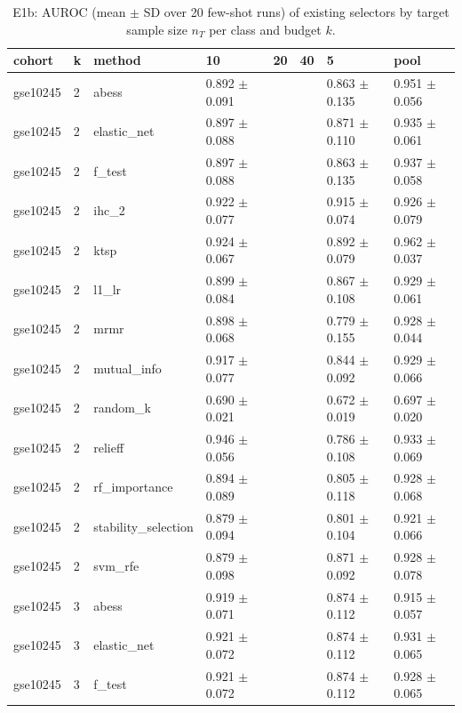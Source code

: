 \begin{table}[t]
  \centering
  \caption{E1b: AUROC (mean $\pm$ SD over 20 few-shot runs) of existing selectors by target sample size $n_T$ per class and budget $k$.}
  \label{tab:e1b}
  \small
  \begin{tabular}{llllllll}
    \toprule
    cohort & k & method & 10 & 20 & 40 & 5 & pool \\
    \midrule
    gse10245 & 2 & abess & 0.892 $\pm$ 0.091 &  &  & 0.863 $\pm$ 0.135 & 0.951 $\pm$ 0.056 \\
    gse10245 & 2 & elastic\_net & 0.897 $\pm$ 0.088 &  &  & 0.871 $\pm$ 0.110 & 0.935 $\pm$ 0.061 \\
    gse10245 & 2 & f\_test & 0.897 $\pm$ 0.088 &  &  & 0.863 $\pm$ 0.135 & 0.937 $\pm$ 0.058 \\
    gse10245 & 2 & ihc\_2 & 0.922 $\pm$ 0.077 &  &  & 0.915 $\pm$ 0.074 & 0.926 $\pm$ 0.079 \\
    gse10245 & 2 & ktsp & 0.924 $\pm$ 0.067 &  &  & 0.892 $\pm$ 0.079 & 0.962 $\pm$ 0.037 \\
    gse10245 & 2 & l1\_lr & 0.899 $\pm$ 0.084 &  &  & 0.867 $\pm$ 0.108 & 0.929 $\pm$ 0.061 \\
    gse10245 & 2 & mrmr & 0.898 $\pm$ 0.068 &  &  & 0.779 $\pm$ 0.155 & 0.928 $\pm$ 0.044 \\
    gse10245 & 2 & mutual\_info & 0.917 $\pm$ 0.077 &  &  & 0.844 $\pm$ 0.092 & 0.929 $\pm$ 0.066 \\
    gse10245 & 2 & random\_k & 0.690 $\pm$ 0.021 &  &  & 0.672 $\pm$ 0.019 & 0.697 $\pm$ 0.020 \\
    gse10245 & 2 & relieff & 0.946 $\pm$ 0.056 &  &  & 0.786 $\pm$ 0.108 & 0.933 $\pm$ 0.069 \\
    gse10245 & 2 & rf\_importance & 0.894 $\pm$ 0.089 &  &  & 0.805 $\pm$ 0.118 & 0.928 $\pm$ 0.068 \\
    gse10245 & 2 & stability\_selection & 0.879 $\pm$ 0.094 &  &  & 0.801 $\pm$ 0.104 & 0.921 $\pm$ 0.066 \\
    gse10245 & 2 & svm\_rfe & 0.879 $\pm$ 0.098 &  &  & 0.871 $\pm$ 0.092 & 0.928 $\pm$ 0.078 \\
    gse10245 & 3 & abess & 0.919 $\pm$ 0.071 &  &  & 0.874 $\pm$ 0.112 & 0.915 $\pm$ 0.057 \\
    gse10245 & 3 & elastic\_net & 0.921 $\pm$ 0.072 &  &  & 0.874 $\pm$ 0.112 & 0.931 $\pm$ 0.065 \\
    gse10245 & 3 & f\_test & 0.921 $\pm$ 0.072 &  &  & 0.874 $\pm$ 0.112 & 0.928 $\pm$ 0.065 \\

\end{tabular}
\end{table}
